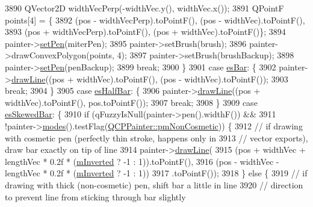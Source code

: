 \begin{DoxyCode}
3890     QVector2D widthVecPerp(-widthVec.y(), widthVec.x());
3891     QPointF points[4] = \{
3892         (pos - widthVecPerp).toPointF(), (pos - widthVec).toPointF(),
3893         (pos + widthVecPerp).toPointF(), (pos + widthVec).toPointF()\};
3894     painter->\hyperlink{class_q_c_p_painter_af9c7a4cd1791403901f8c5b82a150195}{setPen}(miterPen);
3895     painter->setBrush(brush);
3896     painter->drawConvexPolygon(points, 4);
3897     painter->setBrush(brushBackup);
3898     painter->\hyperlink{class_q_c_p_painter_af9c7a4cd1791403901f8c5b82a150195}{setPen}(penBackup);
3899     \textcolor{keywordflow}{break};
3900   \}
3901   \textcolor{keywordflow}{case} \hyperlink{class_q_c_p_line_ending_a5ef16e6876b4b74959c7261d8d4c2cd5a2cf543bbca332df26d89bf779f50469f}{esBar}: \{
3902     painter->\hyperlink{class_q_c_p_painter_a0b4b1b9bd495e182c731774dc800e6e0}{drawLine}((pos + widthVec).toPointF(), (pos - widthVec).toPointF());
3903     \textcolor{keywordflow}{break};
3904   \}
3905   \textcolor{keywordflow}{case} \hyperlink{class_q_c_p_line_ending_a5ef16e6876b4b74959c7261d8d4c2cd5a126c390f0c359fcd8df1fc5e38d26d5b}{esHalfBar}: \{
3906     painter->\hyperlink{class_q_c_p_painter_a0b4b1b9bd495e182c731774dc800e6e0}{drawLine}((pos + widthVec).toPointF(), pos.toPointF());
3907     \textcolor{keywordflow}{break};
3908   \}
3909   \textcolor{keywordflow}{case} \hyperlink{class_q_c_p_line_ending_a5ef16e6876b4b74959c7261d8d4c2cd5a2b2cc96e757ca9bcd91fb70221ed43ab}{esSkewedBar}: \{
3910     \textcolor{keywordflow}{if} (qFuzzyIsNull(painter->pen().widthF()) &&
3911         !painter->\hyperlink{class_q_c_p_painter_a99b89eaf5363faaa1e1e6162856f436c}{modes}().testFlag(\hyperlink{class_q_c_p_painter_a156cf16444ff5e0d81a73c615fdb156dac1e481bfaf408f2bd2eaad3ec341f36b}{QCPPainter::pmNonCosmetic})) \{
3912       \textcolor{comment}{// if drawing with cosmetic pen (perfectly thin stroke, happens only in}
3913       \textcolor{comment}{// vector exports), draw bar exactly on tip of line}
3914       painter->\hyperlink{class_q_c_p_painter_a0b4b1b9bd495e182c731774dc800e6e0}{drawLine}(
3915           (pos + widthVec + lengthVec * 0.2f * (\hyperlink{class_q_c_p_line_ending_a91306fe771d54c955e0af21af14349d5}{mInverted} ? -1 : 1)).toPointF(),
3916           (pos - widthVec - lengthVec * 0.2f * (\hyperlink{class_q_c_p_line_ending_a91306fe771d54c955e0af21af14349d5}{mInverted} ? -1 : 1))
3917               .toPointF());
3918     \} \textcolor{keywordflow}{else} \{
3919       \textcolor{comment}{// if drawing with thick (non-cosmetic) pen, shift bar a little in line}
3920       \textcolor{comment}{// direction to prevent line from sticking through bar slightly}

\end{DoxyCode}
